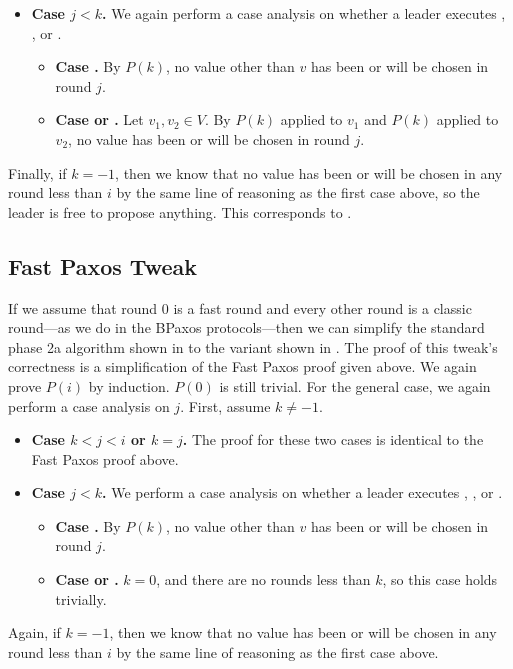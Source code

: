 \begin{itemize}
  \item \textbf{Case $j < k$.}
    We again perform a case analysis on whether a leader executes
    , , or
    .
    \begin{itemize}
      \item \textbf{Case .}
        By $P(k)$, no value other than $v$ has been or will be chosen in round
        $j$.
      \item \textbf{Case  or
                         .}
        Let $v_1, v_2 \in V$. By $P(k)$ applied to $v_1$ and $P(k)$ applied to
        $v_2$, no value has been or will be chosen in round $j$.
    \end{itemize}
\end{itemize}

Finally, if $k = -1$, then we know that no value has been or will be chosen in
any round less than $i$ by the same line of reasoning as the first case above,
so the leader is free to propose anything. This corresponds to
.

\subsection{Fast Paxos Tweak}
If we assume that round $0$ is a fast round and every other round is a classic
round---as we do in the BPaxos protocols---then we can simplify the standard
phase 2a algorithm shown in  to the variant shown in
.
%
The proof of this tweak's correctness is a simplification of the Fast Paxos
proof given above. We again prove $P(i)$ by induction. $P(0)$ is still trivial.
For the general case, we again perform a case analysis on $j$. First, assume $k
\neq -1$.  \begin{itemize}
  \item \textbf{Case $k < j < i$ or $k = j$.}
    The proof for these two cases is identical to the Fast Paxos proof above.

  \item \textbf{Case $j < k$.}
    We perform a case analysis on whether a leader executes
    , , or
    .
    \begin{itemize}
      \item \textbf{Case .}
        By $P(k)$, no value other than $v$ has been or will be chosen in round
        $j$.
      \item \textbf{Case  or
                         .}
        $k = 0$, and there are no rounds less than $k$, so this case
        holds trivially.
    \end{itemize}
\end{itemize}

Again, if $k = -1$, then we know that no value has been or will be chosen in
any round less than $i$ by the same line of reasoning as the first case above.
